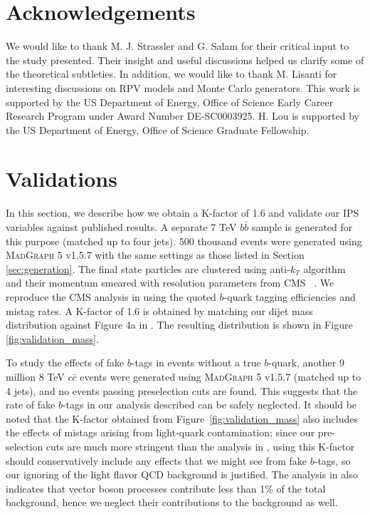 \documentclass{JHEP3}
\newcommand{\IPS}{\textrm{IPS}}
\begin{document}
\section*{Acknowledgements}

We would like to thank M. J. Strassler  and G. Salam for their critical input to the study presented. 
Their insight and useful discussions helped us clarify some of the theoretical subtleties.
In addition, we would like to thank M. Lisanti for interesting discussions on RPV models and Monte Carlo generators. 
This work is supported by the US Department of Energy, Office of Science Early Career Research 
Program under Award Number DE-SC0003925. H. Lou is supported by the US Department of Energy, Office of Science Graduate Fellowship.

\appendix
\section{Validations}
\label{sec:validation}
In this section, we describe how we obtain a K-factor of 1.6 and validate our $\IPS$ variables against published results. 
A separate 7 TeV $b\bar{b}$ sample is generated for this purpose (matched up to four jets). 500 thousand events were generated using
 \textsc{MadGraph 5} v1.5.7 with the same settings as those listed in Section \ref{sec:generation}. The final state particles are 
clustered using anti-$k_{T}$ algorithm and their momentum smeared with resolution parameters from CMS ~\cite{CMS:2009nxa}. We reproduce
the CMS analysis in \cite{Chatrchyan:2013qga} using the quoted $b$-quark tagging efficiencies and mistag rates. A K-factor of 1.6 is 
obtained by matching our dijet mass distribution against Figure 4a in \cite{Chatrchyan:2013qga}. The resulting distribution is shown 
in Figure \ref{fig:validation_mass}.

To study the effects of fake $b$-tags in events without a true $b$-quark, another 9 million 8 TeV $c\bar{c}$ events were generated
using \textsc{MadGraph 5} v1.5.7 (matched up to 4 jets), and no events passing preselection cuts are found. This suggests that the
rate of fake $b$-tags in our analysis described can be safely neglected. It should be noted that the K-factor obtained from
Figure~\ref{fig:validation_mass} also includes the effects of mistags arising from light-quark contamination; since our
pre-selection cuts are much more stringent than the analysis in \cite{Chatrchyan:2013qga}, using this K-factor should
conservatively include any effects that we might see from fake $b$-tags, so our ignoring of the light flavor QCD background is
justified. The analysis in \cite{Chatrchyan:2013qga} also indicates that vector boson processes contribute less than 1\% of the
total background, hence we neglect their contributions to the background as well.
\end{document}
